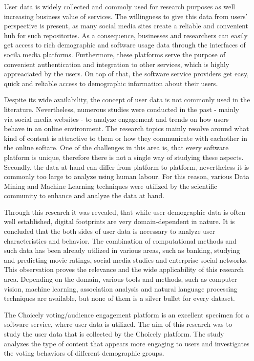 User data is widely collected and commoly used for research purposes as well increasing business value of services. The willingness to give this data from users' perspective is present, as many social media sites create a reliable and convenient hub for such repositories. As a consequence, businesses and researchers can easily get access to rich demographic and software usage data through the interfaces of socila media platforms. Furthermore, these platforms serve the purpose of convenient authentication and integration to other services, which is highly appreaciated by the users. On top of that, the software service providers get easy, quick and reliable access to demographic information about their users. 

Despite its wide availability, the concept of user data is not commonly used in the literature. Nevertheless, numerous studies were conducted in the past - mainly via social media websites - to analyze engagement and trends on how users behave in an online environment. The research topics mainly resolve around what kind of content is attractive to them or how they communicate with eachother in the online softare. One of the challenges in this area is, that every software platform is unique, therefore there is not a single way of studying these aspects. Secondly, the data at hand can differ from platform to platform, nevertheless it is commonly too large to analyze using human labour. For this reason, various Data Mining and Machine Learning techniques were utilized by the scientific community to enhance and analyze the data at hand. 

Through this research it was revealed, that while user demographic data is often well established, digital footprints are very domain-dependent in nature. It is concluded that the both sides of user data is necessary to analyze user characteristics and behavior. The combination of computational methods and such data has been already utilized in various areas, such as banking, studying and predicting movie ratings, social media studies and enterprise social networks. This observation proves the relevance and the wide applicability of this research area. Depending on the domain, various tools and methods, such as computer vision, machine learning, association analysis and natural language processing techniques are available, but none of them is a silver bullet for every dataset. 

The Choicely voting/audience engagement platform is an excellent specimen for a software service, where user data is utilized. The aim of this research was to study the user data that is collected by the Choicely platform. The study analyzes the type of content that appears more engaging to users and investigates the voting behaviors of different demographic groups. 

